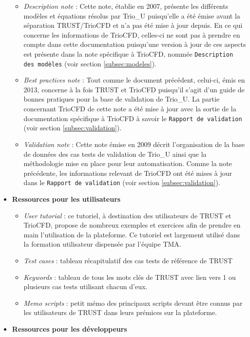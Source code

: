 \begin{itemize}[label=$\Rightarrow$, font=\LARGE]
\begin{itemize}
    \item \textit{Description note} : Cette note, établie en 2007, présente les différents modèles et équations résolus par Trio\_U puisqu'elle a été émise avant la séparation TRUST/TrioCFD et n'a pas été mise à jour depuis. En ce qui concerne les informations de TrioCFD, celles-ci ne sont pas à prendre en compte dans cette documentation puisqu'une version à jour de ces aspects est présente dans la note spécifique à TrioCFD, nommée \texttt{Description des mod\`eles} (voir section \ref{subsec:modeles}).
    \item \textit{Best practices note} : Tout comme le document précédent, celui-ci, émis en 2013, concerne à la fois TRUST et TrioCFD puisqu'il s'agit d'un guide de bonnes pratiques pour la base de validation de Trio\_U. La partie concernant TrioCFD de cette note a été mise à jour avec la sortie de la documentation spécifique à TrioCFD à savoir le \texttt{Rapport de validation} (voir section \ref{subsec:validation}).
    \item \textit{Validation note} : Cette note émise en 2009 décrit l'organisation de la base de données des cas tests de validation de Trio\_U ainsi que la méthodologie mise en place pour leur automatisation. Comme la note précédente, les informations relevant de TrioCFD ont été mises à jour dans le \texttt{Rapport de validation} (voir section \ref{subsec:validation}).
  \end{itemize}
  \item \textbf{Ressources pour les utilisateurs}
  \begin{itemize}
    \item \textit{User tutorial} : ce tutoriel, à destination des utilisateurs de TRUST et TrioCFD, propose de nombreux exemples et exercices afin de prendre en main l'utilisation de la plateforme. Ce tutoriel est largement utilisé dans la formation utilisateur dispensée par l'équipe TMA.
    \item \textit{Test cases} : tableau récapitulatif des cas tests de référence de TRUST
    \item \textit{Keywords} : tableau de tous les mots clés de TRUST avec lien vers 1 ou plusieurs cas tests utilisant chacun d'eux.
    \item \textit{Memo scripts} : petit mémo des principaux scripts devant être connus par les utilisateurs de TRUST dans leurs prémices sur la plateforme.
  \end{itemize}
  \item \textbf{Ressources pour les développeurs}

\end{itemize}
